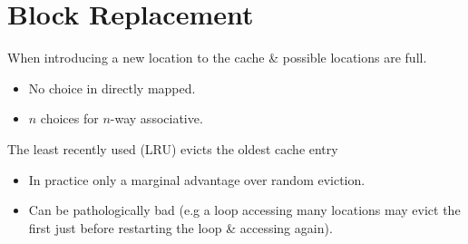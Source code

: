\section{Block Replacement}
When introducing a new location to the cache \& possible locations are full.
\begin{itemize}
    \item No choice in directly mapped.
    \item $n$ choices for $n$-way associative.
\end{itemize}
The least recently used (LRU) evicts the oldest cache entry
\begin{itemize}
    \item In practice only a marginal advantage over random eviction.
    \item Can be pathologically bad (e.g a loop accessing many locations may evict the first just before restarting the loop \& accessing again).
\end{itemize}

